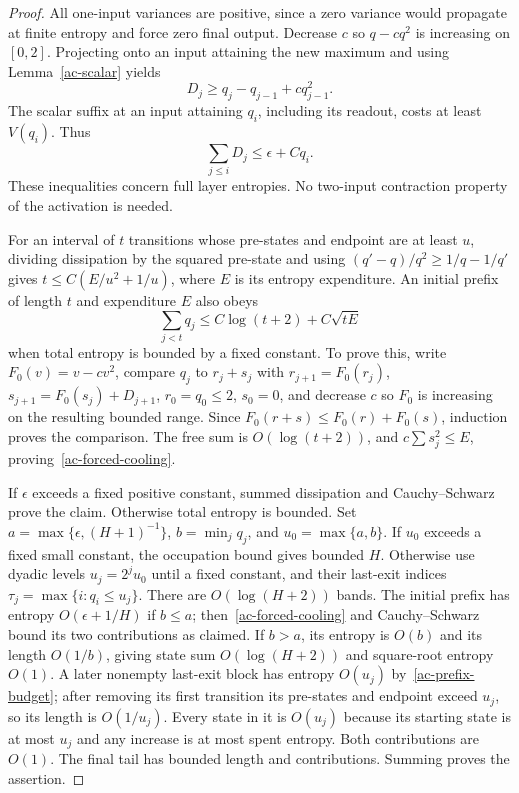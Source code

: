 \begin{proof}
All one-input variances are positive, since a zero variance would
propagate at finite entropy and force zero final output. Decrease $c$
so $q-cq^2$ is increasing on $[0,2]$. Projecting onto an input attaining
the new maximum and using Lemma~\ref{ac-scalar} yields
\[
 D_j\ge q_j-q_{j-1}+cq_{j-1}^2.
\]
The scalar suffix at an input attaining $q_i$, including its readout,
costs at least $V(q_i)$. Thus
\begin{equation}\label{ac-prefix-budget}
 \sum_{j\le i}D_j\le\epsilon+Cq_i.
\end{equation}
These inequalities concern full layer entropies. No two-input
contraction property of the activation is needed.

For an interval of $t$ transitions whose pre-states and endpoint
are at least $u$, dividing dissipation by the squared pre-state and
using $(q'-q)/q^2\ge1/q-1/q'$ gives
$t\le C(E/u^2+1/u)$, where $E$ is its entropy expenditure.
An initial prefix of length $t$ and expenditure $E$ also obeys
\begin{equation}\label{ac-forced-cooling}
 \sum_{j<t}q_j\le C\log(t+2)+C\sqrt{tE}
\end{equation}
when total entropy is bounded by a fixed constant. To prove this,
write $F_0(v)=v-cv^2$, compare $q_j$ to $r_j+s_j$ with
$r_{j+1}=F_0(r_j)$, $s_{j+1}=F_0(s_j)+D_{j+1}$, $r_0=q_0\le2$,
$s_0=0$, and decrease $c$ so $F_0$ is increasing on the resulting
bounded range. Since $F_0(r+s)\le F_0(r)+F_0(s)$, induction proves
the comparison. The free sum is $O(\log(t+2))$, and
$c\sum s_j^2\le E$, proving~\eqref{ac-forced-cooling}.

If $\epsilon$ exceeds a fixed positive constant, summed dissipation
and Cauchy--Schwarz prove the claim. Otherwise total entropy is bounded.
Set $a=\max\{\epsilon,(H+1)^{-1}\}$, $b=\min_jq_j$, and
$u_0=\max\{a,b\}$. If $u_0$ exceeds a fixed small constant, the
occupation bound gives bounded $H$. Otherwise use dyadic levels
$u_j=2^ju_0$ until a fixed constant, and their last-exit indices
$\tau_j=\max\{i:q_i\le u_j\}$. There are $O(\log(H+2))$ bands.
The initial prefix has entropy $O(\epsilon+1/H)$ if $b\le a$;
then~\eqref{ac-forced-cooling} and Cauchy--Schwarz bound its two
contributions as claimed. If $b>a$, its entropy is $O(b)$ and its
length $O(1/b)$, giving state sum $O(\log(H+2))$ and square-root
entropy $O(1)$. A later nonempty last-exit block has entropy $O(u_j)$
by~\eqref{ac-prefix-budget}; after removing its first transition
its pre-states and endpoint exceed $u_j$, so its length is $O(1/u_j)$.
Every state in it is $O(u_j)$ because its starting state is at most
$u_j$ and any increase is at most spent entropy. Both contributions
are $O(1)$. The final tail has bounded length and contributions.
Summing proves the assertion.
\end{proof}

